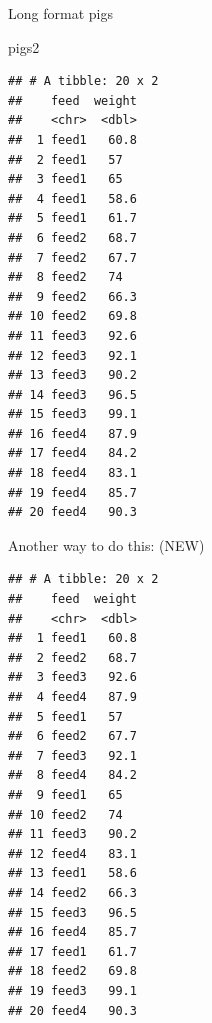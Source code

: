 \documentclass[
  ignorenonframetext,
]{beamer}
\newenvironment{Shaded}{\begin{snugshade}}{\end{snugshade}}
\newcommand{\DataTypeTok}[1]{\textcolor[rgb]{0.13,0.29,0.53}{#1}}
\newcommand{\KeywordTok}[1]{\textcolor[rgb]{0.13,0.29,0.53}{\textbf{#1}}}
\newcommand{\NormalTok}[1]{#1}
\newcommand{\OperatorTok}[1]{\textcolor[rgb]{0.81,0.36,0.00}{\textbf{#1}}}
\newcommand{\StringTok}[1]{\textcolor[rgb]{0.31,0.60,0.02}{#1}}
\begin{document}
\begin{frame}[fragile]{Long format pigs}
\protect\hypertarget{long-format-pigs}{}

\begin{Shaded}
\begin{Highlighting}[]
\NormalTok{pigs2}
\end{Highlighting}
\end{Shaded}

\begin{verbatim}
## # A tibble: 20 x 2
##    feed  weight
##    <chr>  <dbl>
##  1 feed1   60.8
##  2 feed1   57  
##  3 feed1   65  
##  4 feed1   58.6
##  5 feed1   61.7
##  6 feed2   68.7
##  7 feed2   67.7
##  8 feed2   74  
##  9 feed2   66.3
## 10 feed2   69.8
## 11 feed3   92.6
## 12 feed3   92.1
## 13 feed3   90.2
## 14 feed3   96.5
## 15 feed3   99.1
## 16 feed4   87.9
## 17 feed4   84.2
## 18 feed4   83.1
## 19 feed4   85.7
## 20 feed4   90.3
\end{verbatim}

\end{frame}

\begin{frame}[fragile]{Another way to do this: (NEW)}
\protect\hypertarget{another-way-to-do-this-new}{}

\begin{Shaded}
\end{Shaded}

\begin{verbatim}
## # A tibble: 20 x 2
##    feed  weight
##    <chr>  <dbl>
##  1 feed1   60.8
##  2 feed2   68.7
##  3 feed3   92.6
##  4 feed4   87.9
##  5 feed1   57  
##  6 feed2   67.7
##  7 feed3   92.1
##  8 feed4   84.2
##  9 feed1   65  
## 10 feed2   74  
## 11 feed3   90.2
## 12 feed4   83.1
## 13 feed1   58.6
## 14 feed2   66.3
## 15 feed3   96.5
## 16 feed4   85.7
## 17 feed1   61.7
## 18 feed2   69.8
## 19 feed3   99.1
## 20 feed4   90.3
\end{verbatim}

\end{frame}
\end{document}
